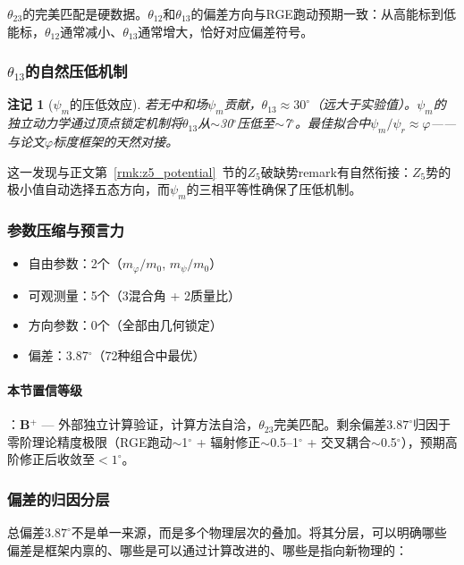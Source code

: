 \documentclass[12pt,a4paper,twocolumn]{article}
\renewcommand{\phi}{\varphi}
\newtheorem{remark}[theorem]{注记}
\begin{document}
$\theta_{23}$的完美匹配是硬数据。$\theta_{12}$和$\theta_{13}$的偏差方向与RGE跑动预期一致：从高能标到低能标，$\theta_{12}$通常减小、$\theta_{13}$通常增大，恰好对应偏差符号。

\subsubsection{$\theta_{13}$的自然压低机制}

\begin{remark}[$\psi_m$的压低效应]
\label{rmk:theta13_suppress}
若无中和场$\psi_m$贡献，$\theta_{13}\approx 30^\circ$（远大于实验值）。$\psi_m$的独立动力学通过顶点锁定机制将$\theta_{13}$从$\sim$30$^\circ$压低至$\sim$7$^\circ$。最佳拟合中$\psi_m/\psi_r \approx \phi$——与论文$\phi$标度框架的天然对接。
\end{remark}

这一发现与正文第~\ref{rmk:z5_potential}~节的$Z_5$破缺势remark有自然衔接：$Z_5$势的极小值自动选择五态方向，而$\psi_m$的三相平等性确保了压低机制。

\subsubsection{参数压缩与预言力}

\begin{itemize}
\item 自由参数：2个（$m_\phi/m_0$, $m_\psi/m_0$）
\item 可观测量：5个（3混合角 + 2质量比）
\item 方向参数：0个（全部由几何锁定）
\item 偏差：3.87$^\circ$（72种组合中最优）
\end{itemize}

\paragraph{本节置信等级}：\textbf{B$^+$} --- 外部独立计算验证，计算方法自洽，$\theta_{23}$完美匹配。剩余偏差$3.87^\circ$归因于零阶理论精度极限（RGE跑动$\sim$1$^\circ$ + 辐射修正$\sim$0.5--1$^\circ$ + 交叉耦合$\sim$0.5$^\circ$），预期高阶修正后收敛至$<1^\circ$。

\subsubsection{偏差的归因分层}
\label{subsubsec:deviation_layers}

总偏差$3.87^\circ$不是单一来源，而是多个物理层次的叠加。将其分层，可以明确哪些偏差是框架内禀的、哪些是可以通过计算改进的、哪些是指向新物理的：
\end{document}
